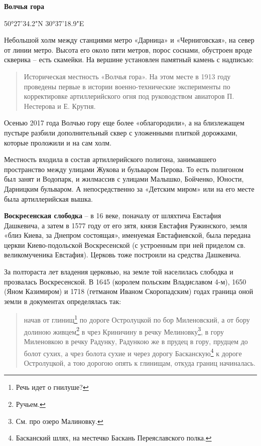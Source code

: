 \medskip

\textbf{Волчья гора} 

50°27'34.2"N 30°37'18.9"E

Небольшой холм между станциями метро «Дарница» и «Черниговская», на север от линии метро. Высота его около пяти метров, порос соснами, обустроен вроде скверика – есть скамейки. На вершине установлен памятный камень с надписью: 

\begin{quotation}
\noindent Историческая местность «Волчья гора». На этом месте в 1913 году проведены первые в истории военно-техни\-ческие эксперименты по корректировке артиллерийского огня под руководством авиаторов П. Нестерова и Е. Крутня.
\end{quotation}

Осенью 2017 года Волчью гору еще более «облагородили», а на близлежащем пустыре разбили дополнительный сквер с уложенными плиткой дорожками, которые проложили и на сам холм.

Местность входила в состав артиллерийского полигона, занимавшего пространство между улицами Жукова и бульваром Перова. То есть  полигоном был занят и Водопарк, и жилмассив с улицами Малышко, Бойченко, Юности, Дарницким бульваром. А непосредственно за «Детским миром» или на его месте была артиллерийская вышка.\\

\medskip


\textbf{Воскресенская слободка} – в 16 веке, поначалу от шляхтича Евстафия Дашкевича, а затем в 1577 году от его зятя, князя Евстафия Ружинского, земля «близ Киева, за Днепром состоящая», именуемая Евстафиевской, была передана церкви Киево-подольской Воскресенской (с устроенным при ней приделом св. великомученика Евстафия). Церковь тоже построили на средства Дашкевича.

За полтораста лет владения церковью, на земле той населилась слободка и прозвалась Воскресенской. В 1645 (королем польским Владиславом 4-м), 1650 (Яном Казимиром) и 1718 (гетманом Иваном Скоропадским) годах граница оной земли в документах определялась так:

\begin{quotation}
\noindent начав от глинищ\footnote{Речь идет о гнилуше?} по дороге Остролуцкой по бор Миленовский, а от бору долиною живцем\footnote{Ручьем.} в чрез Криничину в речку Мелиновку\footnote{См. про озеро Малиновку.}, в гору Миленовкою в речку Радунку, Радункою же в прудец в гору, прудцем до болот сухих, а чрез болота сухие и через дорогу Басканскую\footnote{Басканский шлях, на местечко Баскань Переяславского полка.} к дороге Остролуцкой, а тою дорогою опять к глинищам, откуда границ начиналась.
\end{quotation}

